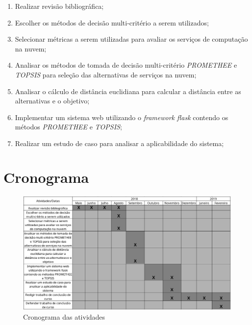 \documentclass[openany, a4paper,12pt, oneside]{article}
\begin{document}
\begin{enumerate}
    \item Realizar revisão bibliográfica;
    \item Escolher os métodos de decisão multi-critério a serem utilizados;
    \item Selecionar métricas a serem utilizadas para avaliar os serviços de computação na nuvem;
    \item Analisar os métodos de tomada de decisão multi-critério \textit{PROMETHEE} e \textit{TOPSIS} para seleção das alternativas de serviços na nuvem;
    \item Analisar o cálculo de distância euclidiana para calcular a distância entre as alternativas e o objetivo;
    \item Implementar um sistema web utilizando o \textit{framework flask} contendo os métodos \textit{PROMETHEE} e \textit{TOPSIS};
    \item Realizar um estudo de caso para analisar a aplicabilidade do sistema;
    
\end{enumerate}

\section{Cronograma}
\label{sec-cron}


\begin{figure}[h]
    \centering
    \includegraphics[width=\textwidth]{cronograma.png}
    \caption{Cronograma das atividades}
    \label{fig:my_label}
\end{figure}



\end{document}
